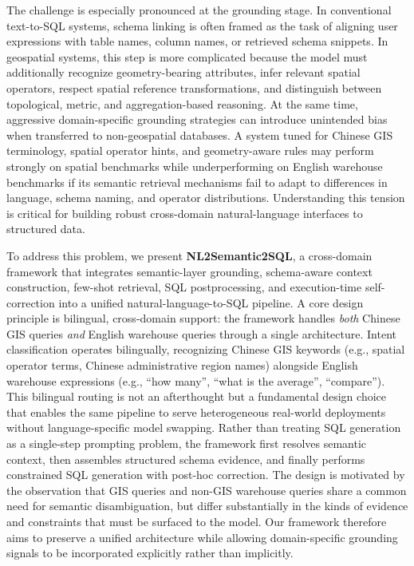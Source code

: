 \documentclass[11pt]{article}
\begin{document}
The challenge is especially pronounced at the grounding stage. In conventional text-to-SQL systems, schema linking is often framed as the task of aligning user expressions with table names, column names, or retrieved schema snippets. In geospatial systems, this step is more complicated because the model must additionally recognize geometry-bearing attributes, infer relevant spatial operators, respect spatial reference transformations, and distinguish between topological, metric, and aggregation-based reasoning. At the same time, aggressive domain-specific grounding strategies can introduce unintended bias when transferred to non-geospatial databases. A system tuned for Chinese GIS terminology, spatial operator hints, and geometry-aware rules may perform strongly on spatial benchmarks while underperforming on English warehouse benchmarks if its semantic retrieval mechanisms fail to adapt to differences in language, schema naming, and operator distributions. Understanding this tension is critical for building robust cross-domain natural-language interfaces to structured data.

To address this problem, we present \textbf{NL2Semantic2SQL}, a cross-domain framework that integrates semantic-layer grounding, schema-aware context construction, few-shot retrieval, SQL postprocessing, and execution-time self-correction into a unified natural-language-to-SQL pipeline. A core design principle is bilingual, cross-domain support: the framework handles \emph{both} Chinese GIS queries \emph{and} English warehouse queries through a single architecture. Intent classification operates bilingually, recognizing Chinese GIS keywords (e.g., spatial operator terms, Chinese administrative region names) alongside English warehouse expressions (e.g., ``how many'', ``what is the average'', ``compare''). This bilingual routing is not an afterthought but a fundamental design choice that enables the same pipeline to serve heterogeneous real-world deployments without language-specific model swapping. Rather than treating SQL generation as a single-step prompting problem, the framework first resolves semantic context, then assembles structured schema evidence, and finally performs constrained SQL generation with post-hoc correction. The design is motivated by the observation that GIS queries and non-GIS warehouse queries share a common need for semantic disambiguation, but differ substantially in the kinds of evidence and constraints that must be surfaced to the model. Our framework therefore aims to preserve a unified architecture while allowing domain-specific grounding signals to be incorporated explicitly rather than implicitly.
\end{document}
